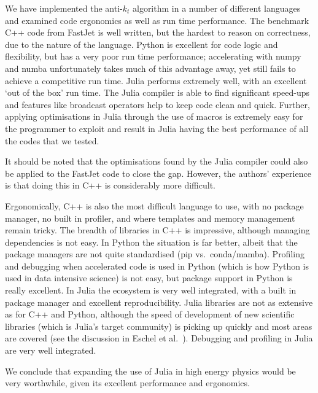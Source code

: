 \documentclass{webofc}
\begin{document}
We have implemented the anti-$k_t$ algorithm in a number of different languages
and examined code ergonomics as well as run time performance. The benchmark C++
code from FastJet is well written, but the hardest to reason on correctness, due
to the nature of the language. Python is excellent for code logic and
flexibility, but has a very poor run time performance; accelerating with numpy
and numba unfortunately takes much of this advantage away, yet still fails to
achieve a competitive run time. Julia performs extremely well, with an excellent
`out of the box' run time. The Julia compiler is able to find significant
speed-ups and features like broadcast operators help to keep code clean and
quick. Further, applying optimisations in Julia through the use of macros is
extremely easy for the programmer to exploit and result in Julia having the best
performance of all the codes that we tested.

It should be noted that the optimisations found by the Julia compiler could also
be applied to the FastJet code to close the gap. However, the authors'
experience is that doing this in C++ is considerably more difficult.

Ergonomically, C++ is also the most difficult language to use, with no package
manager, no built in profiler, and where templates and memory management remain
tricky. The breadth of libraries in C++ is impressive, although managing
dependencies is not easy. In Python the situation is far better, albeit that the
package managers are not quite standardised (pip vs.\ conda/mamba). Profiling
and debugging when accelerated code is used in Python (which is how Python is
used in data intensive science) is not easy, but package support in Python is
really excellent. In Julia the ecosystem is very well integrated, with a built
in package manager and excellent reproducibility. Julia libraries are not as
extensive as for C++ and Python, although the speed of development of new
scientific libraries (which is Julia's target community) is picking up quickly
and most areas are covered (see the discussion in Eschel et
al.~\cite{eschle2023potential}). Debugging and profiling in Julia are very well
integrated.

We conclude that expanding the use of Julia in high energy
physics would be very worthwhile, given its excellent performance and ergonomics.

\sloppy
\raggedright

\end{document}
